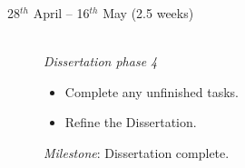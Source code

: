 \begin{description}
\item[28$^{th}$ April -- 16$^{th}$ May (2.5 weeks)] \hfill \\

{\em Dissertation phase 4}
\begin{itemize}
\item Complete any unfinished tasks.
\item Refine the Dissertation.
\end{itemize}
{\em Milestone}: Dissertation complete.\\

\end{description}




